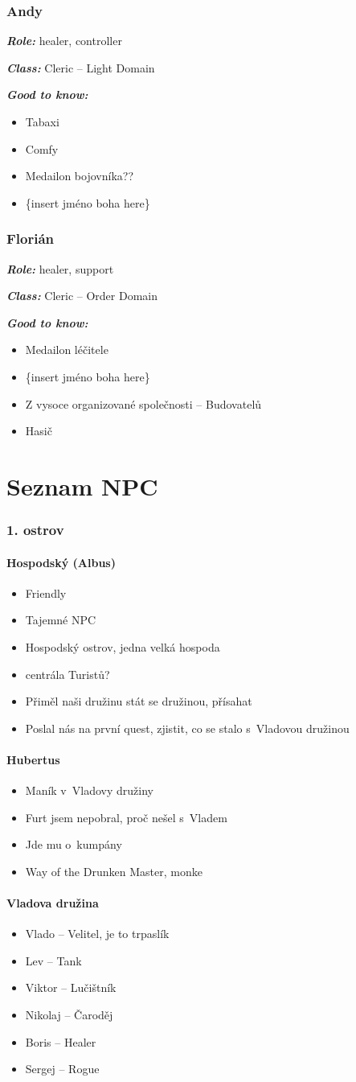 \documentclass[a4paper,twocolumn,openany,nodeprecatedcode, justified]{dndbook}
\newcommand{\bi}{\begin{itemize}}
\newcommand{\ei}{\end{itemize}}
\newcommand{\titulek}[1]{\par \noindent \textbf{\emph{#1:}}}
\begin{document}
	\section{Andy}
	\titulek{Role} healer, controller
	\titulek{Class} Cleric -- Light Domain
	\titulek{Good to know}
	\bi
		\item Tabaxi
		\item Comfy
		\item Medailon bojovníka??
		\item \{insert jméno boha here\}
	\ei
	
	\section{Florián}
	\titulek{Role} healer, support
	\titulek{Class} Cleric -- Order Domain
	\titulek{Good to know}
	\bi
	\item Medailon léčitele
	\item \{insert jméno boha here\}
	\item Z vysoce organizované společnosti -- Budovatelů
	\item Hasič
	\ei
	
	
	
	\part{Seznam NPC}
	\section{1. ostrov}
	\subsection[Hospodský]{Hospodský (Albus)}
	\bi
		\item Friendly
		\item Tajemné NPC
		\item Hospodský ostrov, jedna velká hospoda
		\item centrála Turistů?
		\item Přiměl naši družinu stát se družinou, přísahat
		\item Poslal nás na první quest, zjistit, co se stalo s~Vladovou družinou
	\ei
	
	\subsection{Hubertus}
	\bi
		\item Maník v~Vladovy družiny
		\item Furt jsem nepobral, proč nešel s~Vladem
		\item Jde mu o~kumpány
		\item Way of the Drunken Master, monke
	\ei
	
	\subsection{Vladova družina}
	\bi
		\item Vlado -- Velitel, je to trpaslík
		\item Lev -- Tank
		\item Viktor -- Lučištník
		\item Nikolaj -- Čaroděj
		\item Boris -- Healer
		\item Sergej -- Rogue
	\ei
	
	
	
\end{document}
